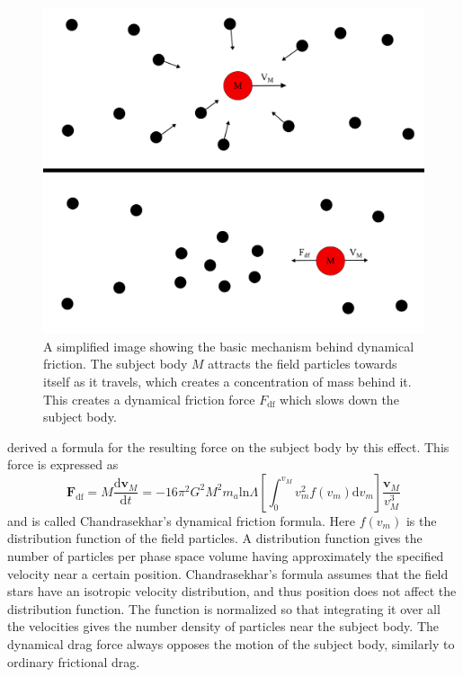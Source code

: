 \documentclass[english, oneside]{HYgradu}
\begin{document}
\begin{figure}[h!tb]
\centering
\includegraphics[scale=0.33]{../images/dynfric.pdf}
\caption{A simplified image showing the basic mechanism behind dynamical friction. The subject body $M$ attracts the field particles towards itself as it travels, which creates a concentration of mass behind it. This creates a dynamical friction force $F_\mathrm{df}$ which slows down the subject body.}
\label{fig:dynfric}
\end{figure}

\cite{chandrasekhar:1943} derived a formula for the resulting force on the subject body by this effect. This force is expressed as
\begin{equation}
\mathbf{F}_{\mathrm{df}} = M \frac{\mathrm{d} \mathbf{v}_M}{\mathrm{d} t} = -16 \pi^2 G^2 M^2 m_a \mathrm{ln} \Lambda \left[ \int_0^{v_M} v_m^2 f(v_m) \mathrm{d}v_m \right] \frac{\mathbf{v}_M}{v_M^3} \label{equ:dynamicalfriction}
\end{equation}
and is called Chandrasekhar's dynamical friction formula. Here $f(v_m)$ is the distribution function of the field particles. A distribution function gives the number of particles per phase space volume having approximately the specified velocity near a certain position. Chandrasekhar's formula assumes that the field stars have an isotropic velocity distribution, and thus position does not affect the distribution function. The function is normalized so that integrating it over all the velocities gives the number density of particles near the subject body. The dynamical drag force always opposes the motion of the subject body, similarly to ordinary frictional drag.
\end{document}
